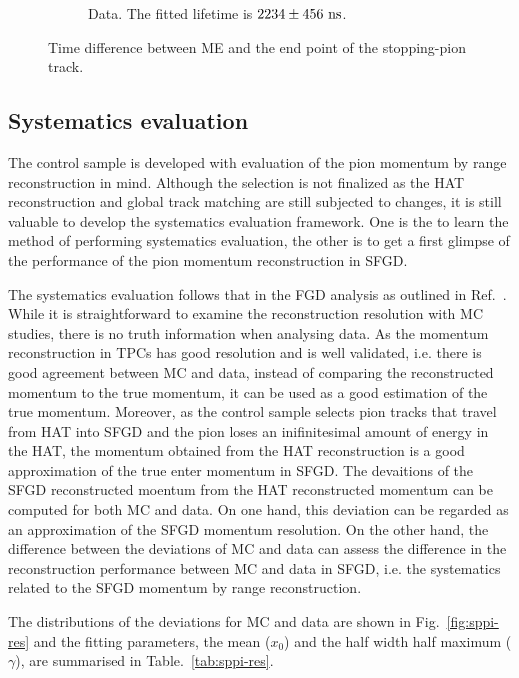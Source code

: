 \begin{figure}
\begin{subfigure}{\dbfigwid\textwidth}
                    \caption{Data. The fitted lifetime is $2234\pm456~\textrm{ns}$.}
                    \label{subfig:sppi-me-data}
               \end{subfigure}
               \caption{Time difference between ME and the end point of the stopping-pion track.}
               \label{fig:sppi-me-td}
          \end{figure}

          \subsection{Systematics evaluation}
          \label{sec:sppi-syst}
          The control sample is developed with evaluation of the pion momentum by range reconstruction in mind.
          Although the selection is not finalized as the HAT reconstruction and global track matching are still subjected to changes, it is still valuable to develop the systematics evaluation framework.
          One is the to learn the method of performing systematics evaluation, the other is to get a first glimpse of the performance of the pion momentum reconstruction in SFGD.

          The systematics evaluation follows that in the FGD analysis as outlined in Ref.~\cite{Jenkins:2022ljx}.
          While it is straightforward to examine the reconstruction resolution with MC studies, there is no truth information when analysing data.
          As the momentum reconstruction in TPCs has good resolution and is well validated, i.e. there is good agreement between MC and data, instead of comparing the reconstructed momentum to the true momentum, it can be used as a good estimation of the true momentum.
          Moreover, as the control sample selects pion tracks that travel from HAT into SFGD and the pion loses an inifinitesimal amount of energy in the HAT, the momentum obtained from the HAT reconstruction is a good approximation of the true enter momentum in SFGD.
          The devaitions of the SFGD reconstructed moentum from the HAT reconstructed momentum can be computed for both MC and data.
          On one hand, this deviation can be regarded as an approximation of the SFGD momentum resolution.
          On the other hand, the difference between the deviations of MC and data can assess the difference in the reconstruction performance between MC and data in SFGD, i.e. the systematics related to the SFGD momentum by range reconstruction.

          The distributions of the deviations for MC and data are shown in Fig.~\ref{fig:sppi-res} and the fitting parameters, the mean ($x_0$) and the half width half maximum ($\gamma$), are summarised in Table.~\ref{tab:sppi-res}.

